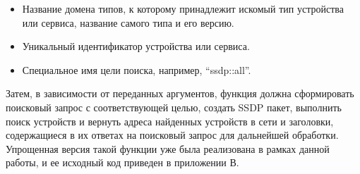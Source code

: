 \begin{itemize}
	\item Название домена типов, к которому принадлежит искомый тип устройства или сервиса, название самого типа и его версию.
	\item Уникальный идентификатор устройства или сервиса.
	\item Специальное имя цели поиска, например, "`ssdp::all"'.
\end{itemize}

Затем, в зависимости от переданных аргументов, функция должна сформировать поисковый запрос с соответствующей целью, создать SSDP пакет, выполнить поиск устройств и вернуть адреса найденных устройств в сети и заголовки, содержащиеся в их ответах на поисковый запрос для дальнейшей обработки.
Упрощенная версия такой функции уже была реализована в рамках данной работы, и ее исходный код приведен в приложении В.
